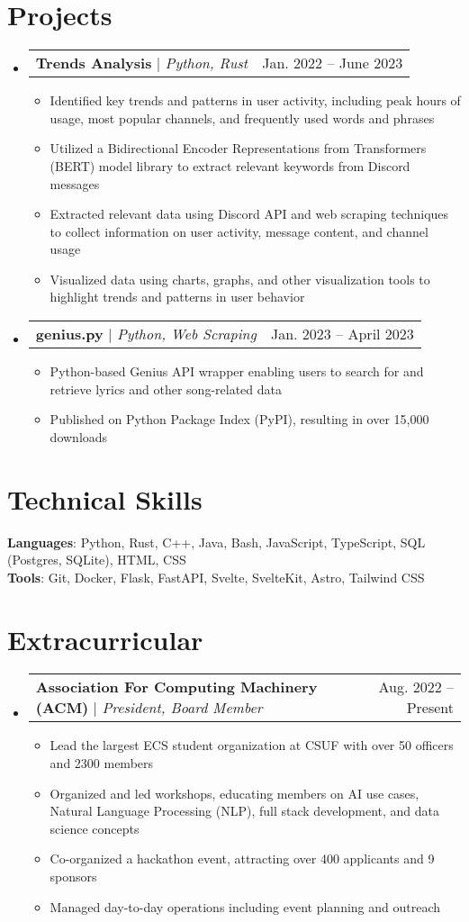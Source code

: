 \documentclass[letterpaper,11pt]{article}
\makeatletter
\newcommand{\resumeItem}[1]{
  \item\small{
    {#1 \vspace{-2pt}}
  }
}
\newcommand{\resumeProjectHeading}[2]{
    \item
    \begin{tabular*}{0.97\textwidth}{l@{\extracolsep{\fill}}r}
      \small#1 & #2 \\
    \end{tabular*}\vspace{-7pt}
}
\newcommand{\resumeSubHeadingListStart}{\begin{itemize}[leftmargin=0.15in, label={}]}
\newcommand{\resumeSubHeadingListEnd}{\end{itemize}}
\newcommand{\resumeItemListStart}{\begin{itemize}}
\newcommand{\resumeItemListEnd}{\end{itemize}\vspace{-5pt}}
\makeatother
\begin{document}
\section{Projects}
    \resumeSubHeadingListStart
        \resumeProjectHeading
              {\textbf{Trends Analysis} $|$ \emph{Python, Rust}}{Jan. 2022 -- June 2023}
              \resumeItemListStart
                \resumeItem{Identified key trends and patterns in user activity, including peak hours of usage, most popular channels, and frequently used words and phrases}
                \resumeItem{Utilized a Bidirectional Encoder Representations from Transformers (BERT) model library to extract relevant keywords from Discord messages}
                \resumeItem{Extracted relevant data using Discord API and web scraping techniques to collect information on user activity, message content, and channel usage}
                \resumeItem{Visualized data using charts, graphs, and other visualization tools to highlight trends and patterns in user behavior}
              \resumeItemListEnd
      \resumeProjectHeading
          {\textbf{genius.py} $|$ \emph{Python, Web Scraping}}{Jan. 2023 -- April 2023}
          \resumeItemListStart
            \resumeItem{Python-based Genius API wrapper enabling users to search for and retrieve lyrics and other song-related data}
            \resumeItem{Published on Python Package Index (PyPI), resulting in over 15,000 downloads}
          \resumeItemListEnd
    \resumeSubHeadingListEnd

\section{Technical Skills}
 \begin{itemize}[leftmargin=0.15in, label={}]
    \small{\item{
     \textbf{Languages}{: Python, Rust, C++, Java, Bash, JavaScript, TypeScript, SQL (Postgres, SQLite), HTML, CSS } \\
     \textbf{Tools}{: Git, Docker, Flask, FastAPI, Svelte, SvelteKit, Astro, Tailwind CSS} \\
    }}
 \end{itemize}

\section{Extracurricular}
    \resumeSubHeadingListStart
      \resumeProjectHeading
          {\textbf{Association For Computing Machinery (ACM) } $|$ \emph{President, Board Member}}{Aug. 2022 -- Present}
          \resumeItemListStart
            \resumeItem{Lead the largest ECS student organization at CSUF with over 50 officers and 2300 members}
            \resumeItem{Organized and led workshops, educating members on AI use cases, Natural Language Processing (NLP), full stack development, and data science concepts}
            \resumeItem{Co-organized a hackathon event, attracting over 400 applicants and 9 sponsors}
            \resumeItem{Managed day-to-day operations including event planning and outreach}
          \resumeItemListEnd
    \resumeSubHeadingListEnd


\end{document}
